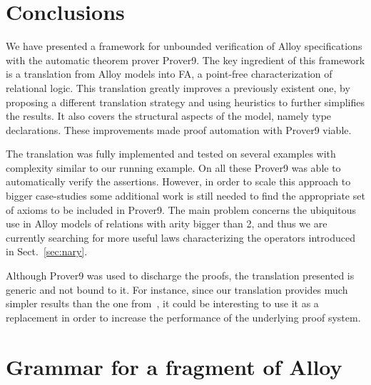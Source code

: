 \documentclass{llncs}
\begin{document}
\section{Conclusions}
\label{sec:conc}

We have presented a framework for unbounded verification of Alloy
specifications with the automatic theorem prover Prover9. The key
ingredient of this framework is a translation from Alloy models into
FA, a point-free characterization of relational logic. This
translation greatly improves a previously existent one, by proposing a
different translation strategy and using heuristics to further
simplifies the results. It also covers the structural aspects of the
model, namely type declarations. These improvements made proof automation
with Prover9 viable.

The translation was fully implemented and tested on several examples
with complexity similar to our running example. On all these Prover9
was able to automatically verify the assertions. However, in order to
scale this approach to bigger case-studies some additional work is
still needed to find the appropriate set of axioms to be included in
Prover9. The main problem concerns the ubiquitous use in Alloy models
of relations with arity bigger than 2, and thus we are currently
searching for more useful laws characterizing the operators introduced
in Sect.~\ref{sec:nary}.

Although Prover9 was used to discharge the proofs, the translation presented is generic and not bound to it. For instance, since our translation provides much simpler results than the one from~\cite{eqalloy}, it could be interesting to use it as a replacement in order to increase the performance of the underlying proof system.






\appendix

\section{Grammar for a fragment of Alloy}
\label{sec:alloysyntax}
\end{document}
